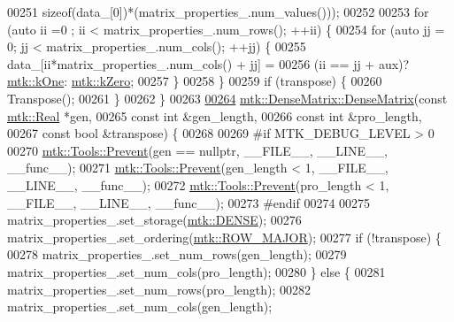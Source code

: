 \begin{DoxyCode}
00251          \textcolor{keyword}{sizeof}(data\_[0])*(matrix\_properties\_.num\_values()));
00252 
00253   \textcolor{keywordflow}{for} (\textcolor{keyword}{auto} ii =0 ; ii < matrix\_properties\_.num\_rows(); ++ii) \{
00254     \textcolor{keywordflow}{for} (\textcolor{keyword}{auto} jj = 0; jj < matrix\_properties\_.num\_cols(); ++jj) \{
00255       data\_[ii*matrix\_properties\_.num\_cols() + jj] =
00256         (ii == jj + aux)? \hyperlink{group__c01-roots_ga26407c24d43b6b95480943340d285c71}{mtk::kOne}: \hyperlink{group__c01-roots_ga59a451a5fae30d59649bcda274fea271}{mtk::kZero};
00257     \}
00258   \}
00259   \textcolor{keywordflow}{if} (transpose) \{
00260     Transpose();
00261   \}
00262 \}
00263 
\hypertarget{mtk__dense__matrix_8cc_source_l00264}{}\hyperlink{classmtk_1_1DenseMatrix_a4a85c10adb8a1d695c992eb5fd3e3dac}{00264} \hyperlink{classmtk_1_1DenseMatrix_a0c75ee704707983f935b02835eab0933}{mtk::DenseMatrix::DenseMatrix}(\textcolor{keyword}{const} \hyperlink{group__c01-roots_gac080bbbf5cbb5502c9f00405f894857d}{mtk::Real} *gen,
00265                               \textcolor{keyword}{const} \textcolor{keywordtype}{int} &gen\_length,
00266                               \textcolor{keyword}{const} \textcolor{keywordtype}{int} &pro\_length,
00267                               \textcolor{keyword}{const} \textcolor{keywordtype}{bool} &transpose) \{
00268 
00269 \textcolor{preprocessor}{  #if MTK\_DEBUG\_LEVEL > 0}
00270   \hyperlink{classmtk_1_1Tools_afe5bb096309258e2e72503fd7b41c7e0}{mtk::Tools::Prevent}(gen == \textcolor{keyword}{nullptr}, \_\_FILE\_\_, \_\_LINE\_\_, \_\_func\_\_);
00271   \hyperlink{classmtk_1_1Tools_afe5bb096309258e2e72503fd7b41c7e0}{mtk::Tools::Prevent}(gen\_length < 1, \_\_FILE\_\_, \_\_LINE\_\_, \_\_func\_\_);
00272   \hyperlink{classmtk_1_1Tools_afe5bb096309258e2e72503fd7b41c7e0}{mtk::Tools::Prevent}(pro\_length < 1, \_\_FILE\_\_, \_\_LINE\_\_, \_\_func\_\_);
00273 \textcolor{preprocessor}{  #endif}
00274 
00275   matrix\_properties\_.set\_storage(\hyperlink{namespacemtk_ga25b67ec6a2afeee69f9bb196a9c66619a00a806d43a7d74e9ccca47a2134e9c87}{mtk::DENSE});
00276   matrix\_properties\_.set\_ordering(\hyperlink{namespacemtk_ga622801bd9f912d0f976c3e383f5f581cabc55178ac16eb1ce89b5f3ab915a91f3}{mtk::ROW\_MAJOR});
00277   \textcolor{keywordflow}{if} (!transpose) \{
00278     matrix\_properties\_.set\_num\_rows(gen\_length);
00279     matrix\_properties\_.set\_num\_cols(pro\_length);
00280   \} \textcolor{keywordflow}{else} \{
00281     matrix\_properties\_.set\_num\_rows(pro\_length);
00282     matrix\_properties\_.set\_num\_cols(gen\_length);

\end{DoxyCode}
